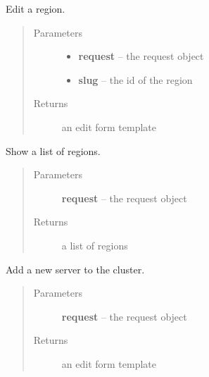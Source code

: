 \documentclass[letterpaper,10pt,english]{sphinxmanual}
\begin{document}
\begin{fulllineitems}
\label{api/cluster:limeade.cluster.views.region_edit}
Edit a region.
\begin{quote}\begin{description}
\item[{Parameters}] \leavevmode\begin{itemize}
\item {} 
\textbf{request} -- the request object

\item {} 
\textbf{slug} -- the id of the region

\end{itemize}

\item[{Returns}] \leavevmode
an edit form template

\end{description}\end{quote}

\end{fulllineitems}


\begin{fulllineitems}
\label{api/cluster:limeade.cluster.views.region_list}
Show a list of regions.
\begin{quote}\begin{description}
\item[{Parameters}] \leavevmode
\textbf{request} -- the request object

\item[{Returns}] \leavevmode
a list of regions

\end{description}\end{quote}

\end{fulllineitems}


\begin{fulllineitems}
\label{api/cluster:limeade.cluster.views.server_add}
Add a new server to the cluster.
\begin{quote}\begin{description}
\item[{Parameters}] \leavevmode
\textbf{request} -- the request object

\item[{Returns}] \leavevmode
an edit form template

\end{description}\end{quote}

\end{fulllineitems}
\end{document}
